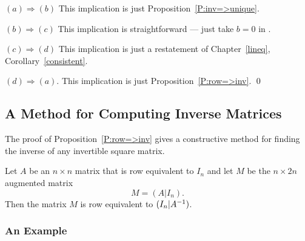 \proof $(a) \Rightarrow (b)$ This implication
is just Proposition~\ref{P:inv=>unique}.

$(b) \Rightarrow (c)$ This implication is straightforward --- just
take $b=0$ in .

$(c) \Rightarrow (d)$  This implication is just a restatement of
Chapter~\ref{lineq}, Corollary~\ref{consistent}.

$(d) \Rightarrow (a)$.  This implication is just
Proposition~\ref{P:row=>inv}. \qed


\subsection*{A Method for Computing Inverse Matrices}

The proof of Proposition~\ref{P:row=>inv} gives a constructive method
for finding the inverse of any invertible square matrix.

\begin{thm}  \label{T:AIn}
Let $A$ be an $n\times n$ matrix that is row equivalent to
$I_n$ and let $M$ be the $n\times 2n$ augmented matrix
\begin{equation}  \label{e:M}
M = (A | I_n).
\end{equation}
Then the matrix $M$ is row equivalent to $(I_n | A^{-1})$.
\end{thm}

\subsubsection*{An Example}

